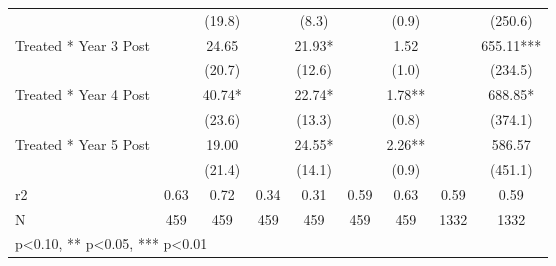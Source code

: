 \begin{table}[htbp]
\begin{tabular}{l*{8}{c}}
            &               &      (19.8)   &               &       (8.3)   &               &       (0.9)   &               &     (250.6)   \\
Treated * Year 3 Post&               &       24.65   &               &       21.93*  &               &        1.52   &               &      655.11***\\
            &               &      (20.7)   &               &      (12.6)   &               &       (1.0)   &               &     (234.5)   \\
Treated * Year 4 Post&               &       40.74*  &               &       22.74*  &               &        1.78** &               &      688.85*  \\
            &               &      (23.6)   &               &      (13.3)   &               &       (0.8)   &               &     (374.1)   \\
Treated * Year 5 Post&               &       19.00   &               &       24.55*  &               &        2.26** &               &      586.57   \\
            &               &      (21.4)   &               &      (14.1)   &               &       (0.9)   &               &     (451.1)   \\
\hline
r2          &        0.63   &        0.72   &        0.34   &        0.31   &        0.59   &        0.63   &        0.59   &        0.59   \\
N           &         459   &         459   &         459   &         459   &         459   &         459   &        1332   &        1332   \\
\hline\hline
\multicolumn{9}{l}{\footnotesize * p<0.10, ** p<0.05, *** p<0.01}\\
\end{tabular}
\end{table}

